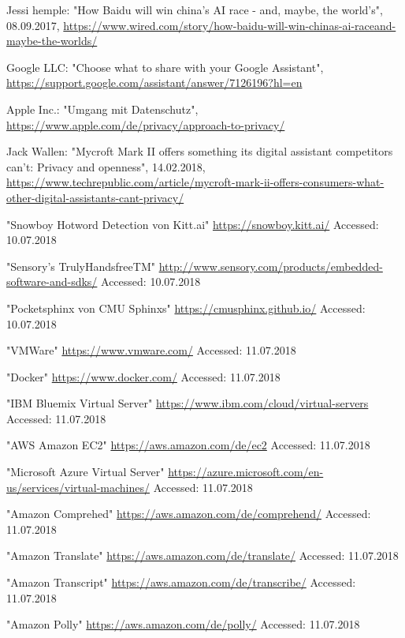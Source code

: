 \documentclass[journal]{IEEEtran}
\begin{document}
\begin{thebibliography}{1}
Jessi hemple: "How Baidu will win china's AI race - and, maybe, the world's", 08.09.2017, \url{https://www.wired.com/story/how-baidu-will-win-chinas-ai-raceand-maybe-the-worlds/}


Google LLC: "Choose what to share with your Google Assistant", \url{https://support.google.com/assistant/answer/7126196?hl=en}

Apple Inc.: "Umgang mit Datenschutz", \url{https://www.apple.com/de/privacy/approach-to-privacy/}

Jack Wallen: "Mycroft Mark II offers something its digital assistant competitors can't: Privacy and openness", 14.02.2018, \url{https://www.techrepublic.com/article/mycroft-mark-ii-offers-consumers-what-other-digital-assistants-cant-privacy/}
	
	
"Snowboy Hotword Detection von Kitt.ai"
\url{https://snowboy.kitt.ai/}
Accessed: 10.07.2018

"Sensory's TrulyHandsfreeTM"
\url{http://www.sensory.com/products/embedded-software-and-sdks/}
Accessed: 10.07.2018

"Pocketsphinx von CMU Sphinxs"
\url{https://cmusphinx.github.io/}
Accessed: 10.07.2018

"VMWare"
\url{https://www.vmware.com/}
Accessed: 11.07.2018

"Docker"
\url{https://www.docker.com/}
Accessed: 11.07.2018

"IBM Bluemix Virtual Server"
\url{https://www.ibm.com/cloud/virtual-servers}
Accessed: 11.07.2018

"AWS Amazon EC2"
\url{https://aws.amazon.com/de/ec2}
Accessed: 11.07.2018

"Microsoft Azure Virtual Server"
\url{https://azure.microsoft.com/en-us/services/virtual-machines/}
Accessed: 11.07.2018

"Amazon Comprehed"
\url{https://aws.amazon.com/de/comprehend/}
Accessed: 11.07.2018

"Amazon Translate"
\url{https://aws.amazon.com/de/translate/}
Accessed: 11.07.2018

"Amazon Transcript"
\url{https://aws.amazon.com/de/transcribe/}
Accessed: 11.07.2018

"Amazon Polly"
\url{https://aws.amazon.com/de/polly/}
Accessed: 11.07.2018


\end{thebibliography}
\end{document}
